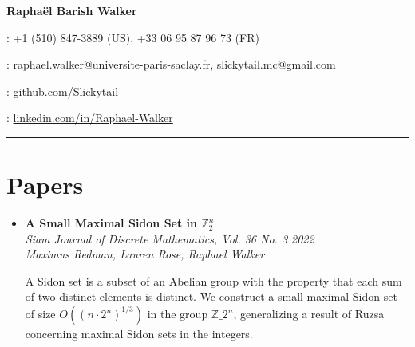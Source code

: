 \documentclass[12pt,letterpaper]{article}
\begin{document}

        {\LARGE{\textbf{Raphaël Barish Walker}}}\vspace{7pt}

        \faPhone : +1 (510) 847-3889 (US), +33 06 95 87 96 73 (FR)\vspace{4pt}

        \faEnvelope : raphael.walker@universite-paris-saclay.fr, slickytail.mc@gmail.com\vspace{4pt}

        \faGithub : \href{https://github.com/Slickytail}{github.com/Slickytail}\vspace{4pt}

        \faLinkedinSquare : \href{https://linkedin.com/in/raphael-walker}{linkedin.com/in/Raphael-Walker}\vspace{4pt}


\hrule

\section*{Papers}
\begin{itemize}[label=]
    \item
        \textbf{A Small Maximal Sidon Set in $\mathbb{Z}_2^n$}\\
        \textit{Siam Journal of Discrete Mathematics, Vol. 36 No. 3 \hfill 2022}\\
        \textit{Maximus Redman, Lauren Rose, Raphael Walker}

        A Sidon set is a subset of an Abelian group with the property that each sum of two distinct elements is distinct. We construct a small maximal Sidon set of size $O((n \cdot 2^n)^{1/3})$ in the group ${\mathbb{Z}}\_2^n$, generalizing a result of Ruzsa concerning maximal Sidon sets in the integers.

\end{itemize}
\end{document}
